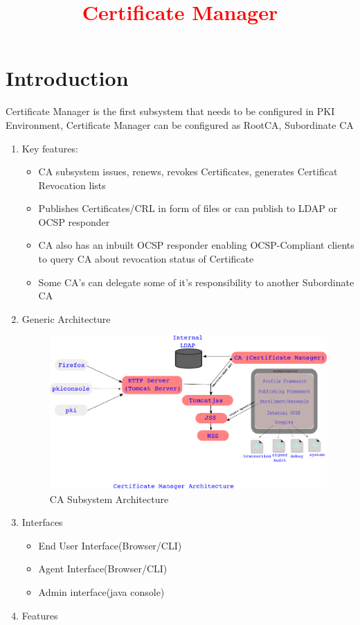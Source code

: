 \documentclass[a4paper, 8pt]{article}
\title{\textcolor{red}{Certificate Manager}}
\begin{document}
\maketitle
\tableofcontents
\section{Introduction}
Certificate Manager is the first subsystem that needs to be configured in PKI Environment, Certificate Manager can be configured as RootCA, Subordinate CA
\begin{enumerate}[label*=\arabic*.]
    \item Key features:
    \begin{itemize}
        \item CA subsystem issues, renews, revokes Certificates, generates Certificat Revocation lists
        \item Publishes Certificates/CRL in form of files or can publish to LDAP or OCSP responder
        \item CA also has an inbuilt OCSP responder enabling OCSP-Compliant clients to query CA about revocation status of Certificate
        \item Some CA's can delegate some of it's responsibility to another Subordinate CA
    \end{itemize}
\item Generic Architecture
    \begin{figure}[ht!]
        \centering
        \includegraphics[width=120mm]{Images/CA-subsystem-Arch3.png}
        \caption{CA Subsystem Architecture}
    \end{figure}
\item Interfaces
    \begin{itemize}
        \item End User Interface(Browser/CLI)
        \item Agent Interface(Browser/CLI)
        \item Admin interface(java console)
    \end{itemize}
\item Features
\end{enumerate}
\end{document}

